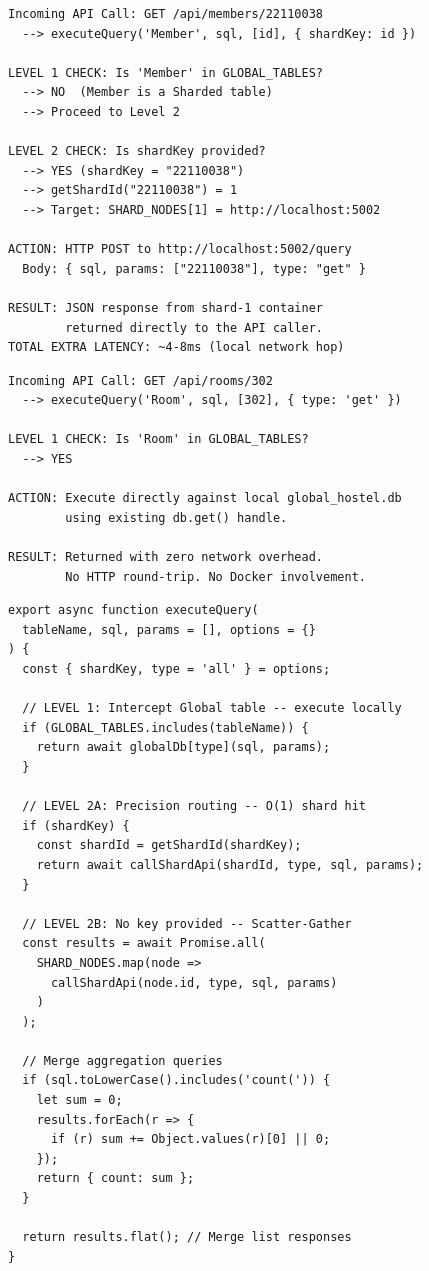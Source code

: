\documentclass[sigconf]{acmart}
\begin{document}
\begin{lstlisting}[style=logstyle, caption={Router Decision Flow: Level 1 \& Level 2 Classification}]
Incoming API Call: GET /api/members/22110038
  --> executeQuery('Member', sql, [id], { shardKey: id })

LEVEL 1 CHECK: Is 'Member' in GLOBAL_TABLES?
  --> NO  (Member is a Sharded table)
  --> Proceed to Level 2

LEVEL 2 CHECK: Is shardKey provided?
  --> YES (shardKey = "22110038")
  --> getShardId("22110038") = 1
  --> Target: SHARD_NODES[1] = http://localhost:5002

ACTION: HTTP POST to http://localhost:5002/query
  Body: { sql, params: ["22110038"], type: "get" }
  
RESULT: JSON response from shard-1 container
        returned directly to the API caller.
TOTAL EXTRA LATENCY: ~4-8ms (local network hop)
\end{lstlisting}

\begin{lstlisting}[style=logstyle, caption={Router Decision Flow: Global Table Interception}]
Incoming API Call: GET /api/rooms/302
  --> executeQuery('Room', sql, [302], { type: 'get' })

LEVEL 1 CHECK: Is 'Room' in GLOBAL_TABLES?
  --> YES

ACTION: Execute directly against local global_hostel.db
        using existing db.get() handle.

RESULT: Returned with zero network overhead.
        No HTTP round-trip. No Docker involvement.
\end{lstlisting}

\begin{lstlisting}[style=jsstyle, caption={Full Two-Level Router Implementation (sharding/router.js)}]
export async function executeQuery(
  tableName, sql, params = [], options = {}
) {
  const { shardKey, type = 'all' } = options;

  // LEVEL 1: Intercept Global table -- execute locally
  if (GLOBAL_TABLES.includes(tableName)) {
    return await globalDb[type](sql, params);
  }

  // LEVEL 2A: Precision routing -- O(1) shard hit
  if (shardKey) {
    const shardId = getShardId(shardKey);
    return await callShardApi(shardId, type, sql, params);
  }

  // LEVEL 2B: No key provided -- Scatter-Gather
  const results = await Promise.all(
    SHARD_NODES.map(node =>
      callShardApi(node.id, type, sql, params)
    )
  );

  // Merge aggregation queries
  if (sql.toLowerCase().includes('count(')) {
    let sum = 0;
    results.forEach(r => {
      if (r) sum += Object.values(r)[0] || 0;
    });
    return { count: sum };
  }

  return results.flat(); // Merge list responses
}
\end{lstlisting}
\end{document}
